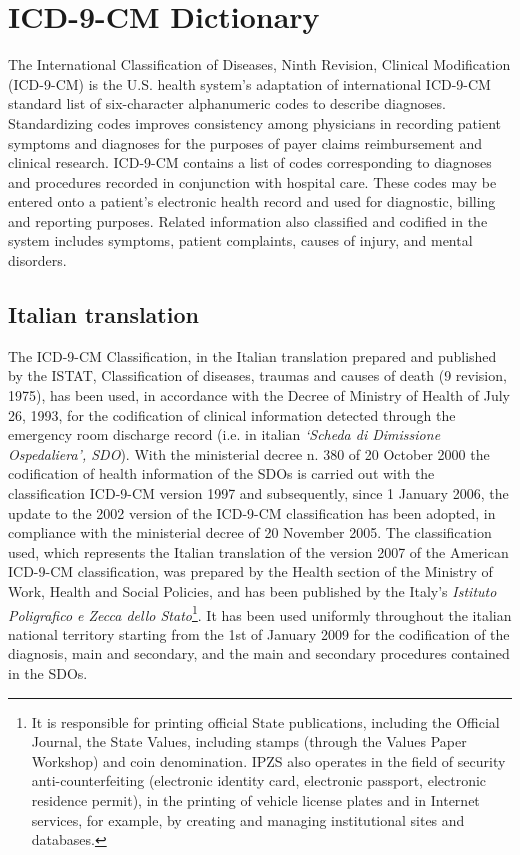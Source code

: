 \section{ICD-9-CM Dictionary}

The International Classification of Diseases, Ninth Revision, Clinical Modification (ICD-9-CM) is the U.S. health system's adaptation of international ICD-9-CM standard list of six-character alphanumeric codes to describe diagnoses. Standardizing codes improves consistency among physicians in recording patient symptoms and diagnoses for the purposes of payer claims reimbursement and clinical research.
ICD-9-CM contains a list of codes corresponding to diagnoses and procedures recorded in conjunction with hospital care. These codes may be entered onto a patient's electronic health record and used for diagnostic, billing and reporting purposes. Related information also classified and codified in the system includes symptoms, patient complaints, causes of injury, and mental disorders.

\subsection{Italian translation}
The ICD-9-CM Classification, in the Italian translation prepared and published by the ISTAT, Classification of diseases, traumas and causes of death (9 revision, 1975), has been used, in accordance with the Decree of Ministry of Health of July 26, 1993, for the codification of clinical information detected through the emergency room discharge record (i.e. in italian \textit{\enquote*{Scheda di Dimissione Ospedaliera}, SDO}). With the ministerial decree n. 380 of 20 October 2000 the codification of health information of the SDOs is carried out with the classification ICD-9-CM version 1997 and subsequently, since 1 January 2006, the update to the 2002 version of the ICD-9-CM classification has been adopted, in compliance with the ministerial decree of 20 November 2005.
The classification used, which represents the Italian translation of the version 2007 of the American ICD-9-CM classification, was prepared by the Health section of the Ministry of Work, Health and Social Policies, and has been published by the Italy's \textit{Istituto Poligrafico e Zecca dello Stato}\footnote{It is responsible for printing official State publications, including the Official Journal, the State Values, including stamps (through the Values Paper Workshop) and coin denomination. IPZS also operates in the field of security anti-counterfeiting (electronic identity card, electronic passport, electronic residence permit), in the printing of vehicle license plates and in Internet services, for example, by creating and managing institutional sites and databases.}. It has been used uniformly throughout the italian national territory starting from the 1st of January 2009 for the codification of the diagnosis, main and secondary, and the main and secondary procedures contained in the SDOs.

